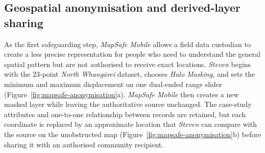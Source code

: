 \documentclass[]{interact}
\begin{document}
\FloatBarrier
\subsection{Geospatial anonymisation and derived-layer sharing}
\label{sec:anonymisation}



As the first safeguarding step, \textit{MapSafe Mobile} allows a field data custodian to create a less precise representation for people who need to understand the general spatial pattern but are not authorised to receive exact locations. \textit{Steven} begins with the 23-point \textit{North Whangārei} dataset, chooses \emph{Halo Masking}, and sets the minimum and maximum displacement on one dual-ended range slider (Figure~\ref{fig:mapsafe-anonymisation}a). \textit{MapSafe Mobile} then creates a new masked layer while leaving the authoritative source unchanged. The case-study attributes and one-to-one relationship between records are retained, but each coordinate is replaced by an approximate location that \textit{Steven} can compare with the source on the unobstructed map (Figure~\ref{fig:mapsafe-anonymisation}b) before sharing it with an authorised community recipient.
\end{document}
